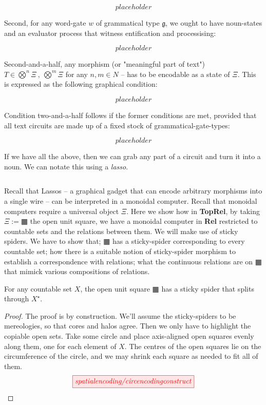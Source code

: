 \begin{fullwidth}
\[placeholder\]

Second, for any word-gate $w$ of grammatical type $\mathfrak{g}$, we ought to have noun-states and an evaluator process that witness entification and processising:

\[placeholder\]

Second-and-a-half, any morphism (or "meaningful part of text") $T \in \bigotimes^n \Xi \ , \ \bigotimes^m \Xi$ for any $n,m \in N$ -- has to be encodable as a state of $\Xi$. This is expressed as the following graphical condition:

\[placeholder\]

Condition two-and-a-half follows if the former conditions are met, provided that all text circuits are made up of a fixed stock of grammatical-gate-types:

\[placeholder\]

If we have all the above, then we can grab any part of a circuit and turn it into a noun. We can notate this using a \emph{lasso}.

\[\]

Recall that Lassos -- a graphical gadget that can encode arbitrary morphisms into a single wire -- can be interpreted in a monoidal computer. Recall that monoidal computers require a universal object $\Xi$. Here we show how in \textbf{TopRel}, by taking $\Xi := \squarehvfill$ the open unit square, we have a monoidal computer in \textbf{Rel} restricted to countable sets and the relations between them. We will make use of sticky spiders. We have to show that; $\squarehvfill$ has a sticky-spider corresponding to every countable set; how there is a suitable notion of sticky-spider morphism to establish a correspondence with relations; what the continuous relations are on $\squarehvfill$ that mimick various compositions of relations.

\begin{proposition}
For any countable set $X$, the open unit square $\squarehvfill$ has a sticky spider that splits through $X^\star$.
\begin{proof}
The proof is by construction. We'll assume the sticky-spiders to be mereologies, so that cores and halos agree. Then we only have to highlight the copiable open sets. Take some circle and place axis-aligned open squares evenly along them, one for each element of $X$. The centres of the open squares lie on the circumference of the circle, and we may shrink each square as needed to fit all of them.
\[\scalebox{1}{\tikzfig{spatialencoding/circencodingconstruct}}\]
\end{proof}
\end{proposition}


\end{fullwidth}
